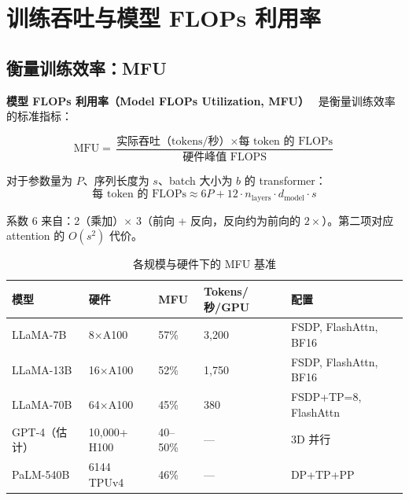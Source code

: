 \section{训练吞吐与模型 FLOPs 利用率}
\label{sec:mfu}

\subsection{衡量训练效率：MFU}
\label{measuring-training-efficiency-mfu}

\textbf{模型 FLOPs 利用率（Model FLOPs Utilization, MFU）}~\cite{chowdhery2022palm} 是衡量训练效率的标准指标：

\begin{equation}
\text{MFU} = \frac{\text{实际吞吐（tokens/秒）} \times \text{每 token 的 FLOPs}}{\text{硬件峰值 FLOPS}}
\end{equation}

对于参数量为 $P$、序列长度为 $s$、batch 大小为 $b$ 的 transformer：
\begin{equation}
\text{每 token 的 FLOPs} \approx 6P + 12 \cdot n_\text{layers} \cdot d_\text{model} \cdot s
\end{equation}

系数 6 来自：2（乘加）$\times$ 3（前向 + 反向，反向约为前向的 $2\times$）。第二项对应 attention 的 $O(s^2)$ 代价。

\begin{table}[ht!]
\centering\small
\caption{各规模与硬件下的 MFU 基准}
\noindent\begin{tabularx}{\linewidth}{@{}l Z{0.78} Z{0.56} Z{0.74} Z{1.92}@{}}
\toprule
\textbf{模型} & \textbf{硬件} & \textbf{MFU} & \textbf{Tokens/秒/GPU} & \textbf{配置} \\
\midrule
LLaMA-7B & 8$\times$A100 & 57\% & 3,200 & FSDP, FlashAttn, BF16 \\
LLaMA-13B & 16$\times$A100 & 52\% & 1,750 & FSDP, FlashAttn, BF16 \\
LLaMA-70B & 64$\times$A100 & 45\% & 380 & FSDP+TP=8, FlashAttn \\
GPT-4（估计） & 10,000+ H100 & 40--50\% & --- & 3D 并行 \\
PaLM-540B & 6144 TPUv4 & 46\% & --- & DP+TP+PP \\
\bottomrule
\end{tabularx}
\end{table}

